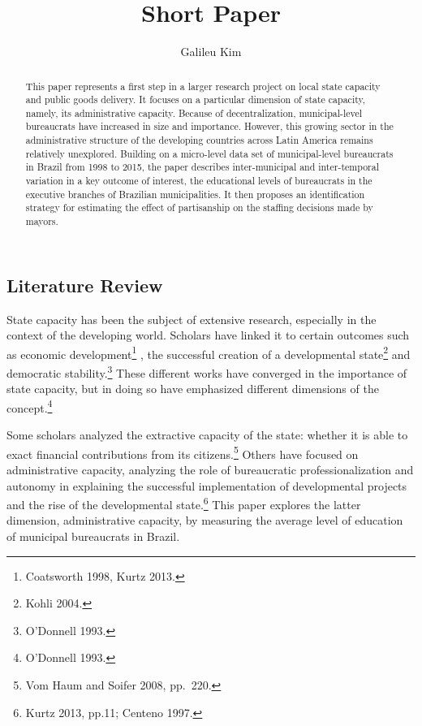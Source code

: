 \documentclass[]{elsarticle} %
\begin{document}
\begin{frontmatter}

  \title{Short Paper}
    \author[Princeton University]{Galileu Kim}
  
    
  \begin{abstract}
  This paper represents a first step in a larger research project on local
  state capacity and public goods delivery. It focuses on a particular
  dimension of state capacity, namely, its administrative capacity.
  Because of decentralization, municipal-level bureaucrats have increased
  in size and importance. However, this growing sector in the
  administrative structure of the developing countries across Latin
  America remains relatively unexplored. Building on a micro-level data
  set of municipal-level bureaucrats in Brazil from 1998 to 2015, the
  paper describes inter-municipal and inter-temporal variation in a key
  outcome of interest, the educational levels of bureaucrats in the
  executive branches of Brazilian municipalities. It then proposes an
  identification strategy for estimating the effect of partisanship on the
  staffing decisions made by mayors.
  \end{abstract}
  
 \end{frontmatter}

\subsection{Literature Review}\label{literature-review}

State capacity has been the subject of extensive research, especially in
the context of the developing world. Scholars have linked it to certain
outcomes such as economic development\footnote{Coatsworth 1998, Kurtz
  2013.} , the successful creation of a developmental state\footnote{Kohli
  2004.} and democratic stability.\footnote{O'Donnell 1993.} These
different works have converged in the importance of state capacity, but
in doing so have emphasized different dimensions of the
concept.\footnote{O'Donnell 1993.}

Some scholars analyzed the extractive capacity of the state: whether it
is able to exact financial contributions from its citizens.\footnote{Vom
  Haum and Soifer 2008, pp.~220.} Others have focused on administrative
capacity, analyzing the role of bureaucratic professionalization and
autonomy in explaining the successful implementation of developmental
projects and the rise of the developmental state.\footnote{Kurtz 2013,
  pp.11; Centeno 1997.} This paper explores the latter dimension,
administrative capacity, by measuring the average level of education of
municipal bureaucrats in Brazil.
\end{document}
